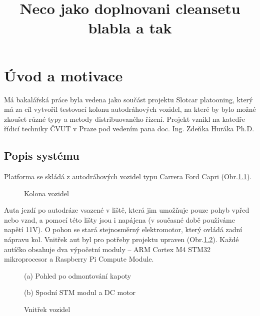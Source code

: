 \documentclass[thesis=M,czech,hidelinks]{FITthesis}[2012/06/26]
\title{Neco jako doplnovani cleansetu blabla a tak}
\begin{document}





\chapter{Úvod a motivace}
Má bakalářská práce byla vedena jako součást projektu Slotcar platooning, který má za cíl vytvořil testovací kolonu autodráhových vozidel, na které by bylo možné zkoušet různé typy a metody distribuovaného řízení. Projekt vznikl na katedře řídicí techniky ČVUT v Praze pod vedením pana doc. Ing. Zdeňka Huráka Ph.D. 

\section{Popis systému}
Platforma se skládá z autodráhových vozidel typu Carrera Ford Capri (Obr.\ref{fig:kolona}).
\begin{figure}[h]
        \centering
        \caption{Kolona vozidel}
        \label{fig:kolona}
\end{figure}

Auta jezdí po autodráze vsazené v liště, která jim umožňuje pouze pohyb vpřed nebo vzad, a pomocí této lišty jsou i napájena (v současné době používáme napětí 11V). O pohon se stará stejnosměrný elektromotor, který ovládá zadní nápravu kol. Vnitřek aut byl pro potřeby projektu upraven (Obr.\ref{fig:cars}). Každé autíčko obsahuje dva výpočetní moduly – ARM Cortex M4 STM32 mikroprocesor a Raspberry Pi Compute Module. 
 \begin{figure}[h]
         \centering

         \begin{minipage}[b]{0.49\textwidth}
                 \caption*{(a) Pohled po odmontování kapoty}
                 \label{fig:car2}
 		\end{minipage}
         \begin{minipage}[b]{0.49\textwidth}
                 \caption*{(b) Spodní STM modul a DC motor}
                 \label{fig:car1}
         \end{minipage}
 	\caption{Vnitřek vozidel}
 	\label{fig:cars}
 \end{figure}
 
\end{document}
